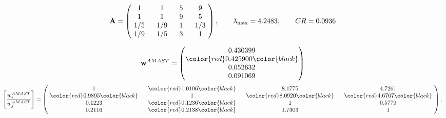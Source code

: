 \begin{example}
\begin{equation*}
\mathbf{A} =
\begin{pmatrix}
$\,\,$ 1 $\,\,$ & $\,\,$1$\,\,$ & $\,\,$5$\,\,$ & $\,\,$9 $\,\,$ \\
$\,\,$ 1 $\,\,$ & $\,\,$ 1 $\,\,$ & $\,\,$9$\,\,$ & $\,\,$5 $\,\,$ \\
$\,\,$ 1/5$\,\,$ & $\,\,$ 1/9$\,\,$ & $\,\,$ 1 $\,\,$ & $\,\,$ 1/3 $\,\,$ \\
$\,\,$ 1/9$\,\,$ & $\,\,$ 1/5$\,\,$ & $\,\,$3$\,\,$ & $\,\,$ 1  $\,\,$ \\
\end{pmatrix},
\qquad
\lambda_{\max} =
4.2483,
\qquad
CR = 0.0936
\end{equation*}

\begin{equation*}
\mathbf{w}^{AMAST} =
\begin{pmatrix}
0.430399\\
\color{red} 0.425900\color{black} \\
0.052632\\
0.091069
\end{pmatrix}\end{equation*}
\begin{equation*}
\left[ \frac{{w}^{AMAST}_i}{{w}^{AMAST}_j} \right] =
\begin{pmatrix}
$\,\,$ 1 $\,\,$ & $\,\,$\color{red} 1.0106\color{black} $\,\,$ & $\,\,$8.1775$\,\,$ & $\,\,$4.7261$\,\,$ \\
$\,\,$\color{red} 0.9895\color{black} $\,\,$ & $\,\,$ 1 $\,\,$ & $\,\,$\color{red} 8.0920\color{black} $\,\,$ & $\,\,$\color{red} 4.6767\color{black}   $\,\,$ \\
$\,\,$0.1223$\,\,$ & $\,\,$\color{red} 0.1236\color{black} $\,\,$ & $\,\,$ 1 $\,\,$ & $\,\,$0.5779 $\,\,$ \\
$\,\,$0.2116$\,\,$ & $\,\,$\color{red} 0.2138\color{black} $\,\,$ & $\,\,$1.7303$\,\,$ & $\,\,$ 1  $\,\,$ \\
\end{pmatrix},
\end{equation*}


\end{example}
